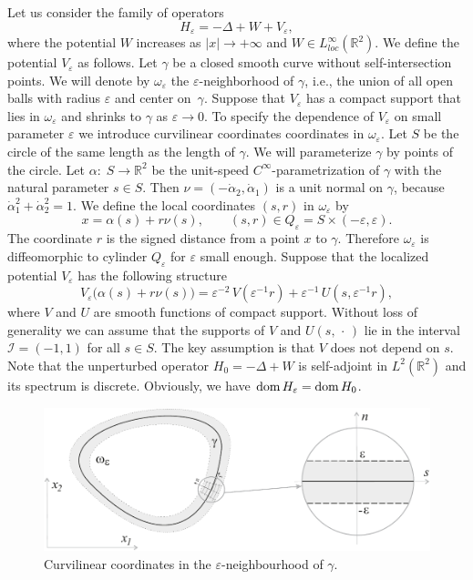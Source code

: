 \documentclass[reqno]{amsart}
\theoremstyle{plain}
\numberwithin{equation}{section}
\newcommand{\dom}{\mathop{\rm dom}}
\newcommand{\Real}{\mathbb R}
\newcommand{\eps}{\varepsilon}
\newcommand{\cI}{\mathcal{I}}
\begin{document}
Let us consider the family of operators
\begin{equation}\label{OprHe}
H_\eps=-\Delta +W+V_\eps,
\end{equation}
where the potential $W$ increases as $|x|\to +\infty$ and $W\in L^\infty_{loc}(\Real^2)$. We define the potential $V_\eps$ as follows.
Let $\gamma$ be a  closed  smooth curve without self-intersection
points. We will denote by $\omega_\eps$ the $\eps$-neighborhood of $\gamma$, i.e., the union of all open balls with radius $\eps$ and center on~$\gamma$.  Suppose that $V_\eps$ has a compact support that lies  in $\omega_\eps$ and  shrinks to $\gamma$ as $\eps\to 0$. To specify  the dependence of $V_\eps$ on  small parameter $\eps$ we introduce  curvilinear coordinates coordinates in $\omega_\eps$. Let $S$ be the circle of the same length as the length of $\gamma$. We will parameterize $\gamma$ by points of the circle.
Let $\alpha\colon\; S\to \Real^2$ be the unit-speed $C^\infty$-parametrization of $\gamma$ with the natural parameter $s\in S$.
Then $\nu=(-\dot{\alpha}_2, \dot{\alpha}_1)$ is a unit normal on $\gamma$, because  $\dot{\alpha}_1^2+\dot{\alpha}_2^2=1$.
We define the local coordinates $(s,r)$ in $\omega_\eps$ by
\begin{equation}\label{LocalTr}
    x=\alpha(s)+r\nu(s), \qquad (s,r)\in Q_\eps=S\times (-\eps, \eps).
\end{equation}
The coordinate $r$ is the signed distance from a point $x$ to $\gamma$.
Therefore  $\omega_\eps$ is diffeomorphic to cylinder $Q_\eps$ for $\eps$ small enough. Suppose that the localized potential $V_\eps$ has the following structure
\begin{equation}\label{Veps}
V_\eps\big(\alpha(s)+r\nu(s)\big)=\eps^{-2}\,V\left(\eps^{-1}r\right)
+\eps^{-1}\,U\left(s,\eps^{-1}r\right),
\end{equation}
where $V$ and $U$ are smooth functions of compact support.
Without loss of generality we can assume that the supports
of $V$ and $U(s,\,\cdot\,)$ lie in the interval $\cI=(-1,1)$ for all $s\in S$.
The key assumption is that $V$ does not depend on  $s$.
Note that the unperturbed operator $H_0=-\Delta +W$ is self-adjoint in $L^2(\Real^2)$ and its spectrum is discrete.  Obviously, we have $\dom H_\eps=\dom H_0$.

\begin{figure}[b]
\centering
\includegraphics[scale=.6]{LocalCoords}
\caption{Curvilinear coordinates in the $\eps$-neighbourhood of $\gamma$.}
\label{FigLocalCoords}
\end{figure}
\end{document}
